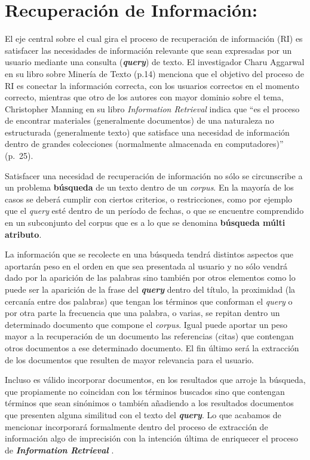 \documentclass[
  10,
  openany]{book}
\begin{document}
\hypertarget{infret}{%
\section{Recuperación de Información:}\label{infret}}

El eje central sobre el cual gira el proceso de recuperación de información (RI) es satisfacer las necesidades de información relevante que sean expresadas por un usuario mediante una consulta (\textbf{\emph{query}}) de texto. El investigador Charu Aggarwal en su libro sobre Minería de Texto \citep{miningt2012} (p.14) menciona que el objetivo del proceso de RI es conectar la información correcta, con los usuarios correctos en el momento correcto, mientras que otro de los autores con mayor dominio sobre el tema, Christopher Manning en su libro \emph{Information Retrieval} indica que ``es el proceso de encontrar materiales (generalmente documentos) de una naturaleza no estructurada (generalmente texto) que satisface una necesidad de información dentro de grandes colecciones (normalmente almacenada en computadores)'' \citep{manning2008} (p.~25).

Satisfacer una necesidad de recuperación de información no sólo se circunscribe a un problema \textbf{búsqueda} de un texto dentro de un \emph{corpus}. En la mayoría de los casos se deberá cumplir con ciertos criterios, o restricciones, como por ejemplo que el \emph{query} esté dentro de un período de fechas, o que se encuentre comprendido en un subconjunto del corpus que es a lo que se denomina \textbf{búsqueda múlti atributo}.

La información que se recolecte en una búsqueda tendrá distintos aspectos que aportarán peso en el orden en que sea presentada al usuario y no sólo vendrá dado por la aparición de las palabras sino también por otros elementos como lo puede ser la aparición de la frase del \textbf{\emph{query}} dentro del título, la proximidad (la cercanía entre dos palabras) que tengan los términos que conforman el \emph{query} o por otra parte la frecuencia que una palabra, o varias, se repitan dentro un determinado documento que compone el \emph{corpus}. Igual puede aportar un peso mayor a la recuperación de un documento las referencias (citas) que contengan otros documentos a ese determinado documento. El fin último será la extracción de los documentos que resulten de mayor relevancia para el usuario.

Incluso es válido incorporar documentos, en los resultados que arroje la búsqueda, que propiamente no coincidan con los términos buscados sino que contengan términos que sean sinónimos o también añadiendo a los resultados documentos que presenten alguna similitud con el texto del \textbf{\emph{query}}. Lo que acabamos de mencionar incorporará formalmente dentro del proceso de extracción de información algo de imprecisión con la intención última de enriquecer el proceso de \textbf{\emph{Information Retrieval}} \citep{kraft2017}.
\end{document}
